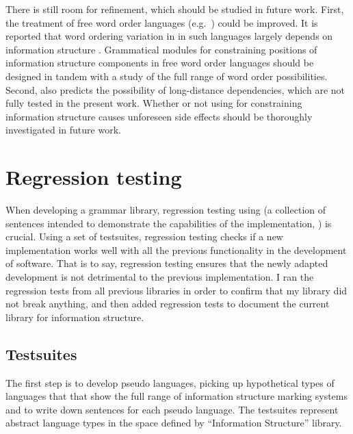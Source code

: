 There is still room for refinement, which should be studied in future
work.  First, the treatment of free word order languages
(e.g.\ ) could be improved.  It is reported that word
ordering variation in in such languages largely depends on information
structure \citep{rodionova:01}.  Grammatical modules for constraining
positions of information structure components in free word order
languages should be designed in tandem with a study of the full range
of word order possibilities. Second,  also predicts
the possibility of long-distance dependencies, which are not fully
tested in the present work. Whether or not using  for
constraining information structure causes unforeseen side effects
should be thoroughly investigated in future work.








\section{Regression testing}
\label{12:sec:pseudo}


When developing a grammar library, regression testing using
 (a collection of sentences intended to demonstrate
the capabilities of the implementation, \citealt{bender:etal:07}) is crucial. 
Using a set of testsuites, regression testing
checks if a new implementation works well with all the previous
functionality in the development of software.  That is to say,
regression testing ensures that the newly adapted development is not
detrimental to the previous implementation.  I ran the regression
tests from all previous libraries in order to confirm that my library
did not break anything, and then added regression tests to document
the current library for information structure.





\subsection{Testsuites}
\label{12:ssec:testsuites}


The first step is to develop pseudo languages, picking up hypothetical
types of languages that that show the full range of information
structure marking systems and to write down sentences for each pseudo
language. The testsuites represent abstract language types in the
space defined by ``Information Structure'' library.


